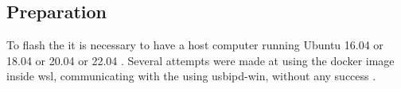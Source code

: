 \subsection{Preparation}
To flash the \jx it is necessary to have a host computer running Ubuntu 16.04 or 18.04 or 20.04 or 22.04 \cite{nvidiaSDKManager2019}.
Several attempts were made at using the docker image inside \gls{wsl}, communicating with the \jx using usbipd-win, without any success \cite{martensPortableSensorRig2022} \cite{nvidiaSDKManager2019} \cite{dorsselaerUsbipdwin2023}.


